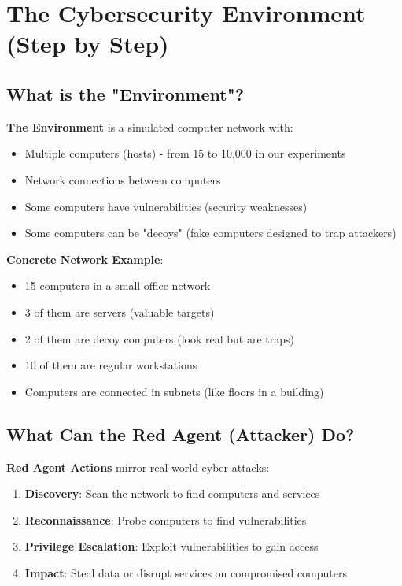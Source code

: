 \documentclass[11pt]{article}
\begin{document}
\section{The Cybersecurity Environment (Step by Step)}

\subsection{What is the "Environment"?}

\begin{foundation}
\textbf{The Environment} is a simulated computer network with:
\begin{itemize}
\item Multiple computers (hosts) - from 15 to 10,000 in our experiments
\item Network connections between computers
\item Some computers have vulnerabilities (security weaknesses)
\item Some computers can be "decoys" (fake computers designed to trap attackers)
\end{itemize}
\end{foundation}

\begin{example}
\textbf{Concrete Network Example}:
\begin{itemize}
\item 15 computers in a small office network
\item 3 of them are servers (valuable targets)
\item 2 of them are decoy computers (look real but are traps)
\item 10 of them are regular workstations
\item Computers are connected in subnets (like floors in a building)
\end{itemize}
\end{example}

\subsection{What Can the Red Agent (Attacker) Do?}

\begin{intuition}
\textbf{Red Agent Actions} mirror real-world cyber attacks:
\begin{enumerate}
\item \textbf{Discovery}: Scan the network to find computers and services
\item \textbf{Reconnaissance}: Probe computers to find vulnerabilities
\item \textbf{Privilege Escalation}: Exploit vulnerabilities to gain access
\item \textbf{Impact}: Steal data or disrupt services on compromised computers
\end{enumerate}
\end{intuition}
\end{document}
